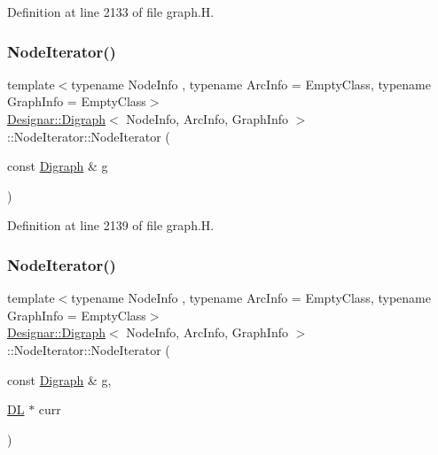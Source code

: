 Definition at line 2133 of file graph.\+H.

\mbox{\label{class_designar_1_1_digraph_1_1_node_iterator_aa54e560d151fad3a8e36c91dc4006ce4}} 
\subsubsection{\texorpdfstring{Node\+Iterator()}{NodeIterator()}\hspace{0.1cm}{\footnotesize\ttfamily [2/5]}}
{\footnotesize\ttfamily template$<$typename Node\+Info , typename Arc\+Info  = Empty\+Class, typename Graph\+Info  = Empty\+Class$>$ \\
\hyperlink{class_designar_1_1_digraph}{Designar\+::\+Digraph}$<$ Node\+Info, Arc\+Info, Graph\+Info $>$\+::Node\+Iterator\+::\+Node\+Iterator (\begin{DoxyParamCaption}\item[{const \hyperlink{class_designar_1_1_digraph}{Digraph} \&}]{g }\end{DoxyParamCaption})\hspace{0.3cm}{\ttfamily [inline]}}



Definition at line 2139 of file graph.\+H.

\mbox{\label{class_designar_1_1_digraph_1_1_node_iterator_a2a8d16402a7ec8ac1675cb2729bc4726}} 
\subsubsection{\texorpdfstring{Node\+Iterator()}{NodeIterator()}\hspace{0.1cm}{\footnotesize\ttfamily [3/5]}}
{\footnotesize\ttfamily template$<$typename Node\+Info , typename Arc\+Info  = Empty\+Class, typename Graph\+Info  = Empty\+Class$>$ \\
\hyperlink{class_designar_1_1_digraph}{Designar\+::\+Digraph}$<$ Node\+Info, Arc\+Info, Graph\+Info $>$\+::Node\+Iterator\+::\+Node\+Iterator (\begin{DoxyParamCaption}\item[{const \hyperlink{class_designar_1_1_digraph}{Digraph} \&}]{g,  }\item[{\hyperlink{class_designar_1_1_d_l}{DL} $\ast$}]{curr }\end{DoxyParamCaption})\hspace{0.3cm}{\ttfamily [inline]}}



